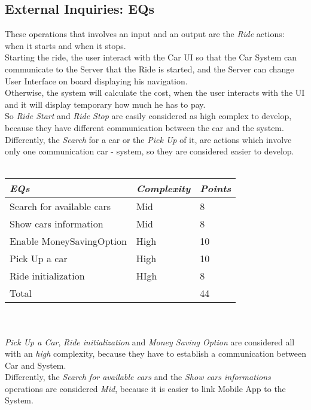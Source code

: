 \documentclass[11pt,a4paper]{report}
\begin{document}
\subsection{External Inquiries: EQs}
These operations that involves an input and an output are the \textit{Ride} actions: when it starts and when it stops.\\
Starting the ride, the user interact with the Car UI so that the Car System can communicate to the Server that the Ride is started, and the Server can change User Interface on board displaying his navigation.\\
Otherwise, the system will calculate the cost, when the user interacts with the UI and it will display temporary how much he has to pay.\\
So \textit{Ride Start} and \textit{Ride Stop} are easily considered as high complex to develop, because they have different communication between the car and the system.\\
Differently, the \textit{Search} for a car or the \textit{Pick Up} of it, are actions which involve only one communication car - system, so they are considered easier to develop.\\\\
\begin{tabularx}{\textwidth}{|X|X|X|}
	\hline
	\textit{EQs} & \textit{Complexity} & \textit{Points}\\
	\hline
	Search for available cars & Mid & 8\\
	Show cars information & Mid & 8\\
	Enable MoneySavingOption & High & 10\\
	Pick Up a car & High & 10\\
	Ride initialization & HIgh & 8\\
	\hline
	\hline
	Total & \multicolumn{1}{X}{} & \multicolumn{1}{X|}{44}\\
	\hline
\end{tabularx}
\\\\
\textit{Pick Up a Car}, \textit{Ride initialization} and \textit{Money Saving Option} are considered all with an \textit{high} complexity, because they have to establish a communication between Car and System.\\
Differently, the \textit{Search for available cars} and the \textit{Show cars informations} operations are considered \textit{Mid}, because it is easier to link Mobile App to the System.
\end{document}
